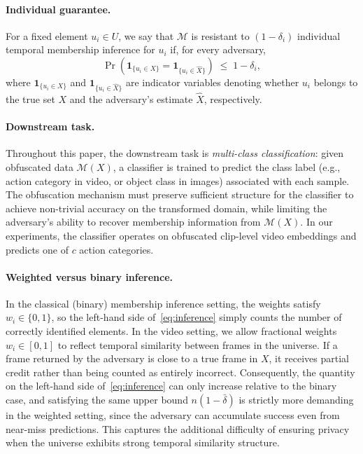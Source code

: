 \documentclass[sigconf,anonymous, review]{acmart}
\begin{document}
\paragraph{Individual guarantee.}
For a fixed element $u_i \in U$, we say that $\mathcal{M}$ is resistant to $(1-\delta_i)$ individual temporal membership inference for $u_i$ if, for every adversary,
\[
\Pr\!\left(
    \mathbf{1}_{\{u_i \in X\}}
    =
    \mathbf{1}_{\{u_i \in \hat{X}\}}
\right)
\;\le\;
1 - \delta_i,
\]
where $\mathbf{1}_{\{u_i \in X\}}$ and $\mathbf{1}_{\{u_i \in \hat{X}\}}$ are indicator variables denoting whether $u_i$ belongs to the true set $X$ and the adversary's estimate $\hat{X}$, respectively.

\paragraph{Downstream task.}
Throughout this paper, the downstream task is \emph{multi-class classification}: given obfuscated data $\mathcal{M}(X)$, a classifier is trained to predict the class label (e.g., action category in video, or object class in images) associated with each sample. The obfuscation mechanism must preserve sufficient structure for the classifier to achieve non-trivial accuracy on the transformed domain, while limiting the adversary's ability to recover membership information from $\mathcal{M}(X)$. In our experiments, the classifier operates on obfuscated clip-level video embeddings and predicts one of $c$ action categories.

\paragraph{Weighted versus binary inference.}
In the classical (binary) membership inference setting, the weights satisfy $w_i \in \{0,1\}$, so the left-hand side of~\eqref{eq:inference} simply counts the number of correctly identified elements. In the video setting, we allow fractional weights $w_i \in [0,1]$ to reflect temporal similarity between frames in the universe. If a frame returned by the adversary is close to a true frame in $X$, it receives partial credit rather than being counted as entirely incorrect. Consequently, the quantity on the left-hand side of~\eqref{eq:inference} can only increase relative to the binary case, and satisfying the same upper bound $n(1-\bar{\delta})$ is strictly more demanding in the weighted setting, since the adversary can accumulate success even from near-miss predictions. This captures the additional difficulty of ensuring privacy when the universe exhibits strong temporal similarity structure.
\end{document}
